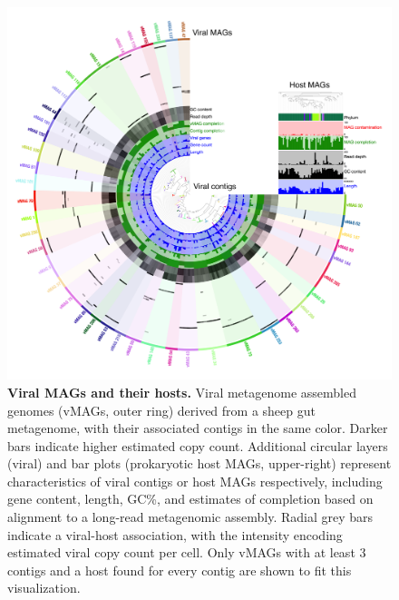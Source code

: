  \begin{figure}[!t]
    \centering
    \includegraphics[width=\textwidth]{Figures/figure_anvio.png}
    \caption{\textbf{Viral MAGs and their hosts.} Viral metagenome assembled genomes (vMAGs, outer ring) derived from a sheep gut metagenome, with their associated contigs in the same color. Darker bars indicate higher estimated copy count. Additional circular layers (viral) and bar plots (prokaryotic host MAGs, upper-right) represent characteristics of viral contigs or host MAGs respectively, including gene content, length, GC\%, and estimates of completion based on alignment to a long-read metagenomic assembly. Radial grey bars indicate a viral-host association, with the intensity encoding estimated viral copy count per cell. Only vMAGs with at least 3 contigs and a host found for every contig are shown to fit this visualization.}
    \label{fig:figure_anvio}
 \end{figure}


